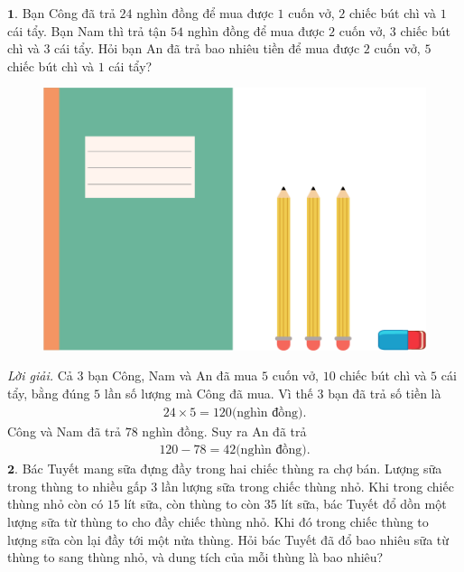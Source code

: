 \begin{multicols}{2}
	$\pmb{1.}$	Bạn Công đã trả $24$ nghìn đồng để mua được $1$ cuốn vở, $2$ chiếc bút chì và $1$ cái tẩy. Bạn Nam thì trả tận $54$ nghìn đồng để mua được $2$ cuốn vở, $3$ chiếc bút chì và $3$ cái tẩy. Hỏi bạn An đã trả bao nhiêu tiền để mua được $2$ cuốn vở, $5$ chiếc bút chì và $1$ cái tẩy?
	\begin{figure}[H]
		\centering
		\vspace*{-5pt}
		\captionsetup{labelformat= empty, justification=centering}
		\includegraphics[width=1\linewidth]{Pi3_bai1}
		\vspace*{-10pt}
	\end{figure}
	\textit{Lời giải.} 	Cả $3$ bạn Công, Nam và An đã mua $5$ cuốn vở, $10$ chiếc bút chì và $5$ cái tẩy, bằng đúng $5$ lần số lượng mà Công đã mua. Vì thế $3$ bạn đã trả số tiền là 
	\begin{align*}
		24\times 5=120 \text{(nghìn đồng).} 
	\end{align*}
	Công và Nam đã trả $78$ nghìn đồng. Suy ra An đã trả 
	\begin{align*}
		120-78 = 42 \text{(nghìn đồng).}	
	\end{align*}
	 $\pmb{2.}$ Bác Tuyết mang sữa đựng đầy trong hai chiếc thùng ra chợ bán. Lượng sữa trong thùng to nhiều gấp $3$ lần lượng sữa trong chiếc thùng nhỏ. Khi trong chiếc thùng nhỏ còn có $15$ lít sữa, còn thùng to còn $35$ lít sữa, bác Tuyết đổ dồn một lượng sữa từ thùng to cho đầy chiếc thùng nhỏ. Khi đó trong chiếc thùng to lượng sữa còn lại  đầy tới một nửa thùng. Hỏi bác Tuyết đã đổ bao nhiêu sữa từ thùng to sang thùng nhỏ, và dung tích của mỗi thùng là bao nhiêu?
	 \begin{figure}[H]

\end{figure}
\end{multicols}
